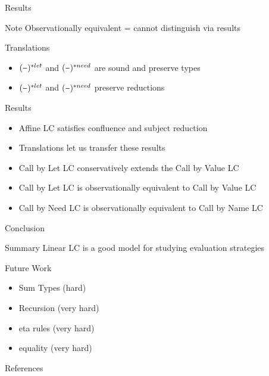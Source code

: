 \documentclass[10pt]{beamer}
\newcommand{\minus}{\scalebox{0.75}[1.0]{$-$}}
\begin{document}
\begin{frame}[fragile]{Results}
  \begin{alertblock}{Note}
    Observationally equivalent = cannot distinguish via results
  \end{alertblock}

  \begin{alertblock}{Translations}
    \begin{itemize}
      \item $(\minus)^{*let}$ and $(\minus)^{*need}$ are sound and preserve types
      \item $(\minus)^{*let}$ and $(\minus)^{*need}$ preserve reductions
    \end{itemize}
  \end{alertblock}

  \begin{alertblock}{Results}
    \begin{itemize}[<+->]
      \item Affine LC satisfies confluence and subject reduction
      \item Translations let us transfer these results
      \item Call by Let LC conservatively extends the Call by Value LC
      \item Call by Let LC is observationally equivalent to Call by Value LC
      \item Call by Need LC is observationally equivalent to Call by Name LC
    \end{itemize}
  \end{alertblock}

\end{frame}


\begin{frame}{Conclusion}


  \begin{alertblock}{Summary}
    Linear LC is a good model for studying evaluation strategies
  \end{alertblock}

  \pause

  \begin{alertblock}{Future Work}
    \begin{itemize}
      \item Sum Types (hard)
      \item Recursion (very hard)
      \item eta rules (very hard)
      \item equality (very hard)
    \end{itemize}
  \end{alertblock}

\end{frame}


\begin{frame}[allowframebreaks]{References}
  \cite{Maraist1995Jan} \\
  
  
\end{frame}
\end{document}
